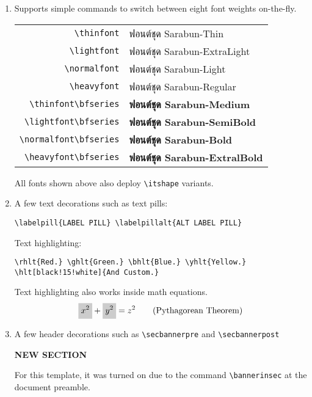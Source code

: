 \begin{enumerate}
\item Supports simple commands to switch between eight font weights on-the-fly.
    \begin{center}
        \begin{tabular}{rl}
            \lstinline"\thinfont"            & {\thinfont ฟอนต์ชุด Sarabun-Thin}                   \\
            \lstinline"\lightfont"           & {\lightfont ฟอนต์ชุด Sarabun-ExtraLight}            \\
            \lstinline"\normalfont"          & {\normalfont ฟอนต์ชุด Sarabun-Light}                \\
            \lstinline"\heavyfont"           & {\heavyfont ฟอนต์ชุด Sarabun-Regular}               \\
            \lstinline"\thinfont\bfseries"   & {\thinfont\bfseries ฟอนต์ชุด Sarabun-Medium}        \\
            \lstinline"\lightfont\bfseries"  & {\lightfont\bfseries ฟอนต์ชุด Sarabun-SemiBold}     \\
            \lstinline"\normalfont\bfseries" & {\normalfont\bfseries ฟอนต์ชุด Sarabun-Bold}        \\
            \lstinline"\heavyfont\bfseries"  & {\heavyfont\bfseries ฟอนต์ชุด Sarabun-ExtralBold}   \\
        \end{tabular}
    \end{center}
    All fonts shown above also deploy \lstinline"\itshape" variants.

\item A few text decorations such as text pills:  
\begin{lstlisting}[numbers=none]
\labelpill{LABEL PILL} \labelpillalt{ALT LABEL PILL}
\end{lstlisting}
    Text highlighting:     
\begin{lstlisting}[numbers=none]
\rhlt{Red.} \ghlt{Green.} \bhlt{Blue.} \yhlt{Yellow.}
\hlt[black!15!white]{And Custom.}
\end{lstlisting}
    Text highlighting also works inside math equations.
    \begin{equation}
        \hlt{x^2} + \hlt{y^2} = z^2  \tag{Pythagorean Theorem}
    \end{equation}

\item A few header decorations such as \lstinline"\secbannerpre" and \lstinline"\secbannerpost"
    \begin{center}
        \Large\heavyfont\bfseries{}
        \secbannerpre{}
        NEW SECTION
        \secbannerpost{}
    \end{center}
    For this template, it was turned on due to the command \lstinline"\bannerinsec" at the document preamble.


\end{enumerate}
